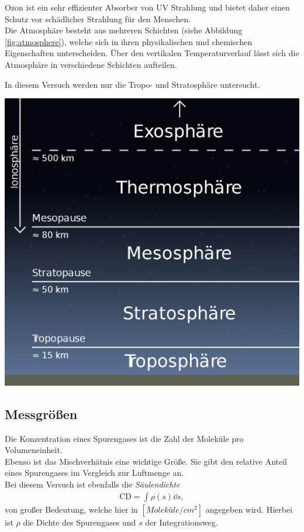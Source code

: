 \documentclass[12pt, a4paper, bibliography=totoc]{scrartcl}
\begin{document}
\begin{multicols}{2}
Ozon ist ein sehr effizienter Absorber von UV Strahlung und bietet daher einen Schutz vor schädlicher Strahlung für den Menschen.\\
    Die Atmosphäre besteht aus mehreren Schichten (siehe Abbildung \ref{fig:atmosphere}), welche sich in ihren physikalischen und chemischen Eigenschaften unterscheiden.
Über den vertikalen Temperaturverlauf lässt sich die Atmosphäre in verschiedene Schichten aufteilen.

In diesem Versuch werden nur die Tropo- und Stratosphäre untersucht.


\begin{center}
    \includegraphics[width=.8\linewidth]{fig/erdatmosphäre.png}
    \label{fig:atmosphere}
   
\end{center}

\subsection{Messgrößen}\label{ssec:Messgröße}

Die Konzentration eines Spurengases ist die Zahl der Moleküle pro Volumeneinheit.\\
Ebenso ist das Mischverhätnis eine wichtige Größe.
Sie gibt den relative Anteil eines Spurengases im Vergleich zur Luftmenge an.\\ 
    Bei diesem Versuch ist ebenfalls die \textit{Säulendichte}
    \begin{align}
        \text{CD} = \int \rho(s) \dd s,
    \end{align}
    von großer Bedeutung, welche hier in  $\si{[Moleküle / cm^2]}$ angegeben wird.
    Hierbei ist $\rho$ die Dichte des Spurengases und $s$ der Integrationsweg.


\end{multicols}
\end{document}
